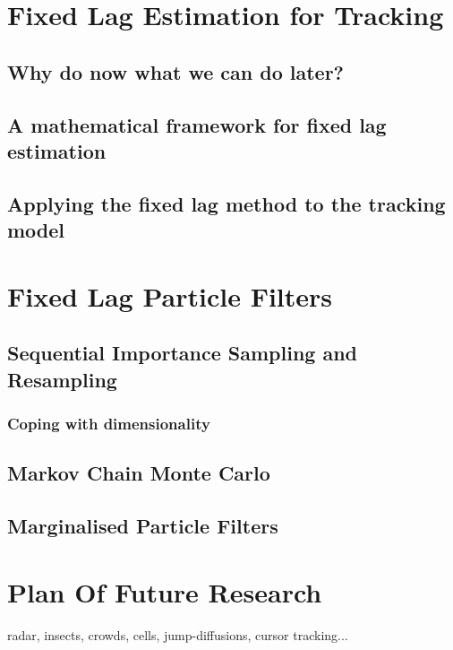 \documentclass{RJWThesis}
\begin{document}
\chapter{Fixed Lag Estimation for Tracking}
\section{Why do now what we can do later?}

\section{A mathematical framework for fixed lag estimation}

\section{Applying the fixed lag method to the tracking model}


\chapter{Fixed Lag Particle Filters}
\section{Sequential Importance Sampling and Resampling}
\subsection{Coping with dimensionality}
\section{Markov Chain Monte Carlo}
\section{Marginalised Particle Filters}

\chapter{Plan Of Future Research}
radar, insects, crowds, cells, jump-diffusions, cursor tracking...



\end{document}
